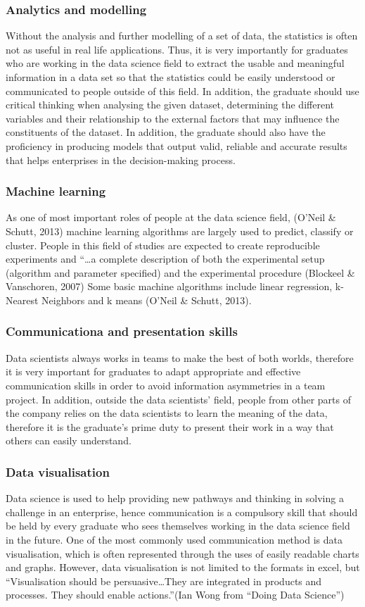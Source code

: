 \documentclass[a4paper, 11pt]{report}
\begin{document}
\subsubsection{Analytics and modelling}
Without the analysis and further modelling of a set of data, the statistics is often not as useful in real life applications. Thus, it is very importantly for graduates who are working in the data science field to extract the usable and meaningful information in a data set so that the statistics could be easily understood or communicated to people outside of this field. In addition, the graduate should use critical thinking when analysing the given dataset, determining the different variables and their relationship to the external factors that may influence the constituents of the dataset. In addition, the graduate should also have the proficiency in producing models that output valid, reliable and accurate results that helps enterprises in the decision-making process.

\subsubsection{Machine learning}
As one of most important roles of people at the data science field, (O’Neil \& Schutt, 2013) machine learning algorithms are largely used to predict, classify or cluster. People in this field of studies are expected to create reproducible experiments and “…a complete description of both the experimental setup (algorithm and parameter specified) and the experimental procedure (Blockeel \& Vanschoren, 2007) Some basic machine algorithms include linear regression, k-Nearest Neighbors and k means (O’Neil \& Schutt, 2013). 

\subsubsection{Communicationa and presentation skills}
Data scientists always works in teams to make the best of both worlds, therefore it is very important for graduates to adapt appropriate and effective communication skills in order to avoid information asymmetries in a team project. In addition, outside the data scientists’ field, people from other parts of the company relies on the data scientists to learn the meaning of the data, therefore it is the graduate’s prime duty to present their work in a way that others can easily understand. 

\subsubsection{Data visualisation}
Data science is used to help providing new pathways and thinking in solving a challenge in an enterprise, hence communication is a compulsory skill that should be held by every graduate who sees themselves working in the data science field in the future. One of the most commonly used communication method is data visualisation, which is often represented through the uses of easily readable charts and graphs. However, data visualisation is not limited to the formats in excel, but “Visualisation should be persuasive…They are integrated in products and processes. They should enable actions.”(Ian Wong from “Doing Data Science”)
\end{document}
